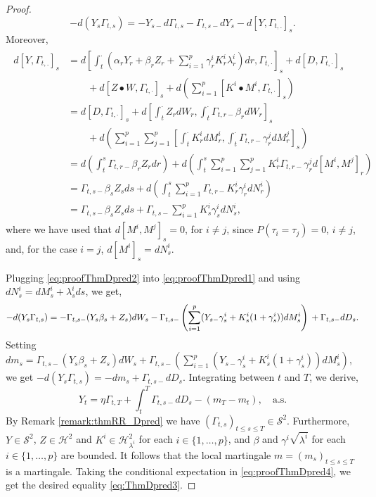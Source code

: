 \documentclass[11pt,a4paper]{article}
\numberwithin{equation}{section}
\theoremstyle{newPlain}
\theoremstyle{newDefinition}
\theoremstyle{newRemark}
\begin{document}
{\begin{proof}
\begin{equation}
        -d(Y_s\Gamma_{t,s}) = -Y_{s-}d\Gamma_{t,s} - \Gamma_{t,s-}dY_s - d[Y,\Gamma_{t,.}]_s.
    \end{equation}
    Moreover,
    \begin{align}\label{eq:proofThmDpred2}
        \begin{aligned}
            d[Y,\Gamma_{t,.}]_s &= d\left[\int_t^\cdot\left(\alpha_rY_r+\beta_rZ_r+\sum_{i=1}^p\gamma_r^iK_r^i\lambda_r^i\right)dr,\Gamma_{t,\cdot}\right]_s + d[D,\Gamma_{t,\cdot}]_s \\
            &\quad\quad+ d[Z\bullet W, \Gamma_{t,\cdot}]_s + d\left(\sum_{i=1}^p[K^i\bullet M^i,\Gamma_{t,\cdot}]_s\right)\\
            &=d[D,\Gamma_{t,\cdot}]_s + d\left[\int_t^\cdot Z_rdW_r, \int_t^\cdot\Gamma_{t,r-}\beta_rdW_r\right]_s\\
	      &\quad\quad+ d\left(\sum_{i=1}^p\sum_{j=1}^p\left[\int_t^\cdot K_r^idM_r^i,\int_t^\cdot\Gamma_{t,r-}\gamma_r^jdM_r^j\right]_s\right)\\
            &= d\left(\int_t^s\Gamma_{t,r-}\beta_rZ_rdr\right) + d\left(\int_t^s\sum_{i=1}^p\sum_{j=1}^pK_r^i\Gamma_{t,r-}\gamma_r^jd[M^i,M^j]_r\right)\\
            &= \Gamma_{t,s-}\beta_sZ_sds + d\left(\int_t^s\sum_{i=1}^p\Gamma_{t,r-}K_r^i\gamma_r^idN_r^i\right)\\
            &= \Gamma_{t,s-}\beta_sZ_sds + \Gamma_{t,s-}\sum_{i=1}^pK_s^i\gamma_s^idN_s^i,
        \end{aligned}
    \end{align}
    where we have used that $d[M^i,M^j]_s = 0$, for $i\ne j$, since $P(\tau_i = \tau_j)=0$, $i\ne j$, and, for the case $i=j$, $d[M^i]_s = dN_s^i$.
    
    Plugging \eqref{eq:proofThmDpred2} into \eqref{eq:proofThmDpred1} and using $dN_s^i = dM_s^i + \lambda_s^ids$, we get,
    \begin{equation}\label{eq:proofThmDpred3}
        -d(Y_s\Gamma_{t,s}) = -\Gamma_{t,s-}(Y_s\beta_s + Z_s)dW_s - \Gamma_{t,s-}\left(\sum_{i=1}^p (Y_{s-}\gamma_s^i + K_s^i(1+\gamma_s^i))dM_s^i\right)\\
        +\Gamma_{t,s-}dD_s.
    \end{equation}
    Setting $dm_s = \Gamma_{t,s-}(Y_s\beta_s + Z_s)dW_s + \Gamma_{t,s-}\left(\sum_{i=1}^p (Y_{s-}\gamma_s^i + K_s^i(1+\gamma_s^i))dM_s^i\right)$, we get $-d(Y_s\Gamma_{t,s}) = -dm_s + \Gamma_{t,s-}dD_s$. Integrating between $t$ and $T$, we derive,
    \begin{equation}\label{eq:proofThmDpred4}
        Y_t = \eta\Gamma_{t,T} + \int_t^T\Gamma_{t,s-}dD_s - (m_T - m_t),\quad\text{a.s.}
    \end{equation}
    By Remark \ref{remark:thmRR_Dpred} we have $(\Gamma_{t,s})_{t\le s\le T}\in\mathcal{S}^2$. Furthermore, $Y\in\mathcal{S}^2$, $Z\in\mathcal{H}^2$ and $K^i\in\mathcal{H}_{\lambda^i}^2$ for each $i\in\{1,\ldots,p\}$, and $\beta$ and $\gamma^i\sqrt{\lambda^i}$ for each $i\in\{1,\ldots,p\}$ are bounded. It follows that the local martingale $m = (m_s)_{t\le s\le T}$ is a martingale.  Taking the conditional expectation in \eqref{eq:proofThmDpred4}, we get the desired equality \eqref{eq:ThmDpred3}.
\end{proof}

}
\end{document}
